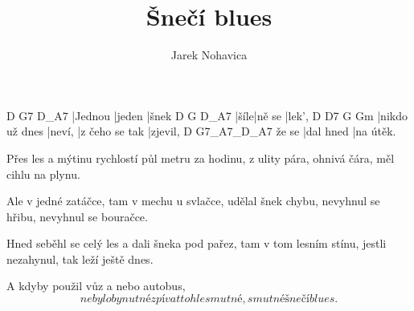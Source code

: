 \documentclass{song}
\title{Šnečí blues}
\author{Jarek Nohavica}
\begin{document}
\strophe
D       G7     D_A7
|Jednou |jeden |šnek
D    G      D_A7
|šíle|ně se |lek',
D              D7     G              Gm
|nikdo už dnes |neví, |z čeho se tak |zjevil,
      D         G7_A7_D_A7
že se |dal hned |na útěk.
\endstrophe

\strophe*
Přes les a mýtinu
rychlostí půl metru za hodinu,
z ulity pára, ohnivá čára,
měl cihlu na plynu.
\endstrophe

\strophe*
Ale v jedné zatáčce,
tam v mechu u svlačce,
udělal šnek chybu, nevyhnul se hřibu,
nevyhnul se bouračce.
\endstrophe

\strophe*
Hned seběhl se celý les
a dali šneka pod pařez,
tam v tom lesním stínu, jestli nezahynul,
tak leží ještě dnes.
\endstrophe

\strophe*
A kdyby použil vůz
a nebo autobus,
\[ nebylo by nutné zpívat tohle smutné,
smutné šnečí blues. \]
\endstrophe
\end{document}
